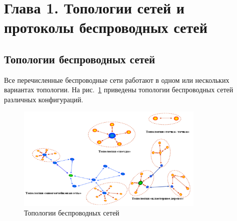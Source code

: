 \documentclass[a4paper,12pt]{article}
\begin{document}

\newpage

\section{Глава 1. Топологии сетей и протоколы беспроводных сетей}

\subsection{Топологии беспроводных сетей}
Все перечисленные беспроводные сети работают в одном или нескольких вариантах
топологии. На рис.~\ref{fig:topologies} приведены топологии беспроводных сетей различных конфигураций.

\begin{figure}[h]
    \centering
    \includegraphics[width=0.8\textwidth]{images/Fig06.png}
    \caption{Топологии беспроводных сетей \cite{wirelessNetProtocols} }
    \label{fig:topologies}
\end{figure}
\end{document}

